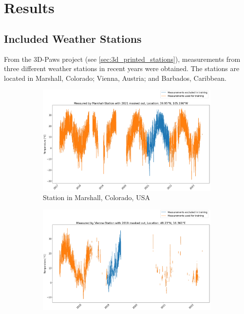 \section{Results}
\label{sec:results}

\subsection{Included Weather Stations}

From the 3D-Paws project (see \autoref{sec:3d_printed_stations}), measurements from three different weather stations in recent years were obtained. The stations are located in Marshall, Colorado; Vienna, Austria; and Barbados, Caribbean.

\begin{figure}
    \centering
    \begin{subfigure}{0.672\textwidth}
        \includegraphics[width=\textwidth]{resources/images/charts/marshall_available_measurements.png}
        \caption{Station in Marshall, Colorado, USA}
        \label{fig:available_measurements_marshall}
    \end{subfigure}
    \begin{subfigure}{0.672\textwidth}
        \includegraphics[width=\textwidth]{resources/images/charts/vienna_available_measurements.png}

\end{subfigure}
\end{figure}
